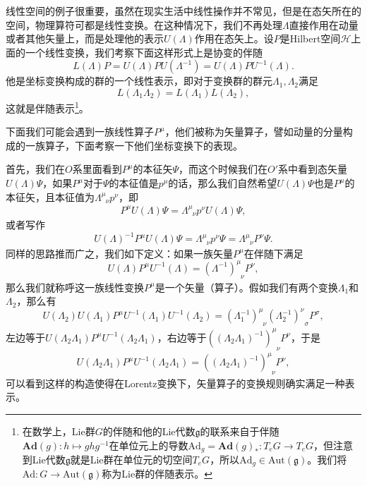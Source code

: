 
线性空间的例子很重要，虽然在现实生活中线性操作并不常见，但是在态矢所在的空间，物理算符可都是线性变换。在这种情况下，我们不再处理$\Lambda$直接作用在动量或者其他矢量上，而是处理他的表示$U(\Lambda)$作用在态矢上。设$P$是Hilbert空间$\mathcal{H}$上面的一个线性变换，我们考察下面这样形式上是协变的伴随
\[
	L(\Lambda)P=U(\Lambda) P U(\Lambda^{-1})=U(\Lambda) P U^{-1}(\Lambda).
\]
他是坐标变换构成的群的一个线性表示，即对于变换群的群元$\Lambda_1,\Lambda_2$满足
\[
	L(\Lambda_1\Lambda_2)=L(\Lambda_1)L(\Lambda_2),
\]
这就是伴随表示\footnote{在数学上，Lie群$G$的伴随和他的Lie代数$\mathfrak{g}$的联系来自于伴随$\bm{Ad}(g):h\mapsto ghg^{-1}$在单位元上的导数$\mathrm{Ad}_g=\bm{Ad}(g)_*:T_eG\to T_eG$，但注意到Lie代数$\mathfrak{g}$就是Lie群在单位元的切空间$T_eG$，所以$\mathrm{Ad}_g\in \mathrm{Aut}(\mathfrak{g})$。我们将$\mathrm{Ad}:G\to \mathrm{Aut}(\mathfrak{g})$称为Lie群的伴随表示。}。


下面我们可能会遇到一族线性算子$P^\mu$，他们被称为矢量算子，譬如动量的分量构成的一族算子，下面考察一下他们坐标变换下的表现。

首先，我们在$O$系里面看到$P^\mu$的本征矢$\Psi$，而这个时候我们在$O'$系中看到态矢量$U(\Lambda)\Psi$，如果$P^\mu$对于$\Psi$的本征值是$p^\mu$的话，那么我们自然希望$U(\Lambda)\Psi$也是$P^\mu$的本征矢，且本征值为$\Lambda^\mu_{\phantom{\mu}\nu}p^\nu$，即
\[
	P^\mu U(\Lambda)\Psi=\Lambda^\mu_{\phantom{\mu}\nu}p^\nu U(\Lambda)\Psi,
\]
或者写作
\[
	U(\Lambda)^{-1}P^\mu U(\Lambda)\Psi=\Lambda^\mu_{\phantom{\mu}\nu}p^\nu \Psi=\Lambda^\mu_{\phantom{\mu}\nu}P^\nu \Psi.
\]
同样的思路推而广之，我们如下定义：如果一族矢量$P^\mu$在伴随下满足
\[
	U(\Lambda) P^\mu U^{-1}(\Lambda)=(\Lambda^{-1})^\mu_{\phantom{\mu}\nu}P^\nu,
\]
那么我们就称呼这一族线性变换$P^\mu$是一个矢量（算子）。假如我们有两个变换$\Lambda_1$和$\Lambda_2$，那么有
\[
	U(\Lambda_2)U(\Lambda_1) P^\mu U^{-1}(\Lambda_1)U^{-1}(\Lambda_2)=(\Lambda_1^{-1})^\mu_{\phantom{\mu}\nu}(\Lambda_2^{-1})^\nu_{\phantom{\mu}\sigma}P^\sigma,
\]
左边等于$U(\Lambda_2\Lambda_1) P^\mu U^{-1}(\Lambda_2\Lambda_1)$，右边等于$\left((\Lambda_2\Lambda_1)^{-1}\right)^\mu_{\phantom{\mu}\nu}P^\nu$，于是
\[
U(\Lambda_2\Lambda_1) P^\mu U^{-1}(\Lambda_2\Lambda_1)=\left((\Lambda_2\Lambda_1)^{-1}\right)^\mu_{\phantom{\mu}\nu}P^\nu,
\]
可以看到这样的构造使得在Lorentz变换下，矢量算子的变换规则确实满足一种表示。


